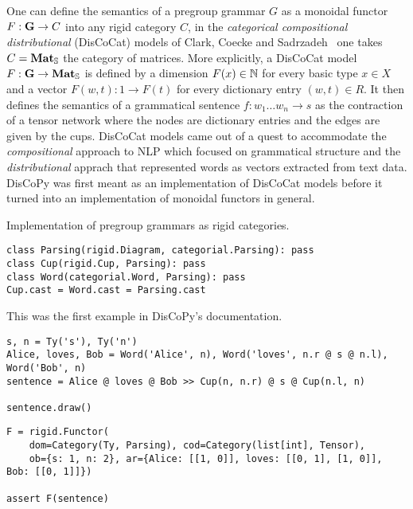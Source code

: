 One can define the semantics of a pregroup grammar $G$ as a monoidal functor $F : \G \to C$ into any rigid category $C$, in the \emph{categorical compositional distributional} (DisCoCat) models of Clark, Coecke and Sadrzadeh~\cite{ClarkEtAl08,ClarkEtAl10} one takes $C = \mathbf{Mat}_\S$ the category of matrices.
More explicitly, a DisCoCat model $F : \G \to \mathbf{Mat}_\S$ is defined by a dimension $F(x) \in \N$ for every basic type $x \in X$ and a vector $F(w, t) : 1 \to F(t)$ for every dictionary entry $(w, t) \in R$.
It then defines the semantics of a grammatical sentence $f : w_1 \dots w_n \to s$ as the contraction of a tensor network where the nodes are dictionary entries and the edges are given by the cups.
DisCoCat models came out of a quest to accommodate the \emph{compositional} approach to NLP which focused on grammatical structure and the \emph{distributional} apprach that represented words as vectors extracted from text data.
DisCoPy was first meant as an implementation of DisCoCat models before it turned into an implementation of monoidal functors in general.

\begin{python}
{\normalfont Implementation of pregroup grammars as rigid categories.}

\begin{verbatim}
class Parsing(rigid.Diagram, categorial.Parsing): pass
class Cup(rigid.Cup, Parsing): pass
class Word(categorial.Word, Parsing): pass
Cup.cast = Word.cast = Parsing.cast
\end{verbatim}
\end{python}

\begin{example}
This was the first example in DisCoPy's documentation.

\begin{verbatim}
s, n = Ty('s'), Ty('n')
Alice, loves, Bob = Word('Alice', n), Word('loves', n.r @ s @ n.l), Word('Bob', n)
sentence = Alice @ loves @ Bob >> Cup(n, n.r) @ s @ Cup(n.l, n)

sentence.draw()
\end{verbatim}


\begin{verbatim}
F = rigid.Functor(
    dom=Category(Ty, Parsing), cod=Category(list[int], Tensor),
    ob={s: 1, n: 2}, ar={Alice: [[1, 0]], loves: [[0, 1], [1, 0]], Bob: [[0, 1]]})

assert F(sentence)
\end{verbatim}
\end{example}

